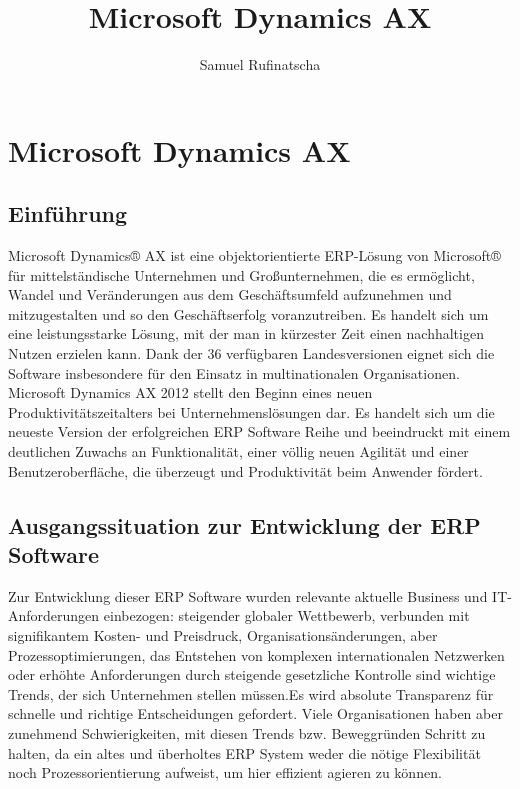 \documentclass[a4paper]{article}
\title{Microsoft Dynamics AX}
\author{Samuel Rufinatscha}
\begin{document}
\maketitle
\begin{sloppypar}

\section{Microsoft Dynamics AX}


\subsection{Einführung}
Microsoft Dynamics® AX ist eine objektorientierte ERP-Lösung von Microsoft® für mittelständische Unternehmen und Großunternehmen, die es ermöglicht, Wandel und Veränderungen aus dem Geschäftsumfeld aufzunehmen und mitzugestalten und so den Geschäftserfolg voranzutreiben. Es handelt sich um eine leistungsstarke Lösung, mit der man in kürzester Zeit einen nachhaltigen Nutzen erzielen kann.
Dank der 36 verfügbaren Landesversionen eignet sich die Software insbesondere für den Einsatz in multinationalen Organisationen.
Microsoft Dynamics AX 2012 stellt den Beginn eines neuen Produktivitätszeitalters bei Unternehmenslösungen dar. Es handelt sich um die neueste Version der erfolgreichen ERP Software Reihe und beeindruckt mit einem deutlichen Zuwachs an Funktionalität, einer völlig neuen Agilität und einer Benutzeroberfläche, die überzeugt und Produktivität beim Anwender fördert.


\subsection{Ausgangssituation zur Entwicklung der ERP Software}
Zur Entwicklung dieser ERP Software wurden relevante aktuelle Business und IT-Anforderungen einbezogen: steigender globaler Wettbewerb, verbunden mit signifikantem Kosten- und Preisdruck, Organisationsänderungen, aber Prozessoptimierungen, das Entstehen von komplexen internationalen Netzwerken oder erhöhte Anforderungen durch steigende gesetzliche Kontrolle sind wichtige Trends, der sich Unternehmen stellen müssen.Es wird absolute Transparenz für schnelle und richtige Entscheidungen gefordert.
Viele Organisationen haben aber zunehmend Schwierigkeiten, mit diesen Trends bzw. Beweggründen Schritt zu halten, da ein altes und überholtes ERP System weder die nötige Flexibilität noch Prozessorientierung aufweist, um hier effizient agieren zu können.



\end{sloppypar}
\end{document}
